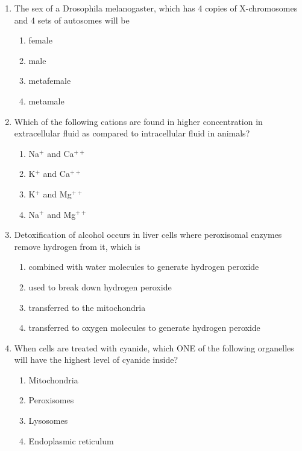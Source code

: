 \documentclass[journal,12pt,onecolumn]{IEEEtran}
\begin{document}
\begin{enumerate}[label=\arabic*.]
\item The sex of a Drosophila melanogaster, which has 4 copies of X-chromosomes and 4 sets of autosomes will be

\begin{multicols}{4}
\begin{enumerate}[label=(\Alph*)]
\item female
\item male
\item metafemale
\item metamale
\end{enumerate}
\end{multicols}

\item Which of the following cations are found in higher concentration in extracellular fluid as compared to intracellular fluid in animals?

\begin{multicols}{4}
\begin{enumerate}[label=(\Alph*)]
\item Na$^+$ and Ca$^{++}$
\item K$^+$ and Ca$^{++}$
\item K$^+$ and Mg$^{++}$
\item Na$^+$ and Mg$^{++}$
\end{enumerate}
\end{multicols}

\item Detoxification of alcohol occurs in liver cells where peroxisomal enzymes remove hydrogen from it, which is

\begin{multicols}{2}
\begin{enumerate}[label=(\Alph*)]
\item combined with water molecules to generate hydrogen peroxide
\item used to break down hydrogen peroxide
\item transferred to the mitochondria
\item transferred to oxygen molecules to generate hydrogen peroxide
\end{enumerate}
\end{multicols}

\item When cells are treated with cyanide, which ONE of the following organelles will have the highest level of cyanide inside?

\begin{multicols}{2}
\begin{enumerate}[label=(\Alph*)]
\item Mitochondria
\item Peroxisomes
\item Lysosomes
\item Endoplasmic reticulum
\end{enumerate}
\end{multicols}


\end{enumerate}
\end{document}
